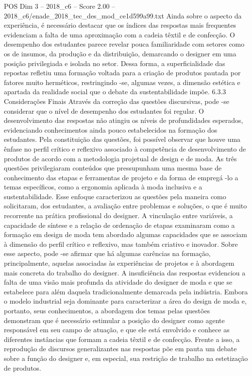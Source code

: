\begin{textsample}{POS Dim 3 – 2018\_c6 – Score 2.00 – 2018\_c6/enade\_2018\_tec\_des\_mod\_ce1d599a99.txt}
Ainda sobre o aspecto da experiência, é necessário destacar que os índices das respostas mais frequentes evidenciam a falta de uma aproximação com a cadeia têxtil e de confecção.
O desempenho dos estudantes parece revelar pouca familiaridade com setores como os de insumos, da produção e da distribuição, demarcando o designer em uma posição privilegiada e isolada no setor.
Dessa forma, a superficialidade das repostas refletiu uma formação voltada para a criação de produtos pautada por fatores muito herméticos, restringindo -se, algumas vezes, a dimensão estética e apartada da realidade social que o debate da sustentabilidade impõe. 6.3.3 Considerações Finais Através da correção das questões discursivas, pode -se considerar que o nível de desempenho dos estudantes foi regular.
O desenvolvimento das respostas não atingiu os níveis de profundidades esperados, evidenciando conhecimentos ainda pouco estabelecidos na formação dos estudantes.
Pela constituição das questões, foi possível observar que houve uma ênfase no perfil crítico e reflexivo associado à competência de desenvolvimento de produtos de acordo com a metodologia projetual de design e de moda.
As três questões privilegiaram conteúdos que pressupunham uma mesma base de conhecimento das etapas e ferramentas de projeto e da forma de empregá -lo a temas específicos, como a ergonomia aplicada à moda inclusiva e a sustentabilidade.
Esse enfoque caracterizou as questões pela maneira como solicitaram, dos estudantes, a avaliação entre problemas e soluções, o que é muito recorrente na prática profissional do designer.
A vinculação entre variáveis, a capacidade de síntese e a relação de ordenação de etapas examinaram como a formação em design de moda tem abordado algumas capacidades que se associam à dimensão do perfil crítico e reflexivo, mas também criativo e inovador.
Sobre esse aspecto, pode -se afirmar que há algumas carências na formação, principalmente, aquelas associadas às experiências de projetos e à abordagem mais concreta do trabalho do designer.
A insuficiência das respostas evidenciou a falta de uma visão mais profunda da atividade do designer de moda e que se estabelece para além daquela tradicionalmente demarcada pela indústria.
Embora o modelo industrial seja dominante para caracterizar a área do design de moda e, portanto, seus conhecimentos, a abordagem dos temas pelas questões demonstram que é necessário estimular a posição do designer como agente responsável em seu campo de atuação, e que ele está envolvido e conhece as diferentes instâncias que formam a cadeia têxtil e de confecção.
Frente a isso, a reprodução de discursos generalizantes nas respostas põe em pauta um debate sobre a função do designer e, em especial, sua restrição de trabalho na estetização de produtos.

\end{textsample}
